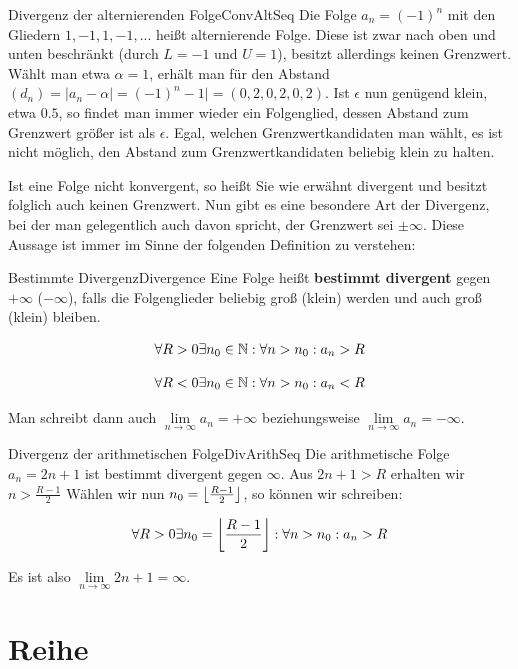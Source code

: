 \begin{example}{Divergenz der alternierenden Folge}{ConvAltSeq}
	Die Folge $a_n = (-1)^n$ mit den Gliedern $1,-1,1,-1,...$ heißt alternierende Folge. Diese ist zwar nach oben und unten beschränkt (durch $L=-1$ und $U=1$), besitzt allerdings keinen Grenzwert. Wählt man etwa $\alpha=1$, erhält man für den Abstand $(d_n) = |a_n-\alpha|=(-1)^n-1| = (0, 2, 0, 2, 0, 2)$. Ist $\epsilon$ nun genügend klein, etwa $0.5$, so findet man immer wieder ein Folgenglied, dessen Abstand zum Grenzwert größer ist als $\epsilon$. Egal, welchen Grenzwertkandidaten man wählt, es ist nicht möglich, den Abstand zum Grenzwertkandidaten beliebig klein zu halten.
\end{example}

Ist eine Folge nicht konvergent, so heißt Sie wie erwähnt divergent und besitzt folglich auch keinen Grenzwert. Nun gibt es eine besondere Art der Divergenz, bei der man gelegentlich auch davon spricht, der Grenzwert sei $\pm\infty$. Diese Aussage ist immer im Sinne der folgenden Definition zu verstehen:

\begin{definition}{Bestimmte Divergenz}{Divergence}
	Eine Folge heißt \textbf{bestimmt divergent} gegen $+\infty$ ($-\infty$), falls die Folgenglieder beliebig groß (klein) werden und auch groß (klein) bleiben.

	$$
	\forall R > 0 \exists n_0\in\mathbb{N}: \forall n > n_0 : a_n > R
	$$

	$$
	\forall R < 0 \exists n_0\in\mathbb{N}: \forall n > n_0 : a_n < R
	$$

	Man schreibt dann auch $\lim\limits_{n\to\infty}a_n = +\infty$ beziehungsweise $\lim\limits_{n\to\infty}a_n = -\infty$.
\end{definition}


\begin{example}{Divergenz der arithmetischen Folge}{DivArithSeq}
	Die arithmetische Folge $a_n=2n+1$ ist bestimmt divergent gegen $\infty$. Aus $2n+1 > R$ erhalten wir $n > \frac{R-1}{2}$ Wählen wir nun $n_0 = \left\lfloor \frac{R-1}{2} \right\rfloor$, so können wir schreiben:

	$$
	\forall R > 0 \exists n_0 = \left\lfloor \frac{R-1}{2} \right\rfloor: \forall n > n_0 : a_n > R
	$$

	Es ist also $\lim\limits_{n\to\infty} 2n+1 = \infty$.
\end{example}


\section{Reihe}

